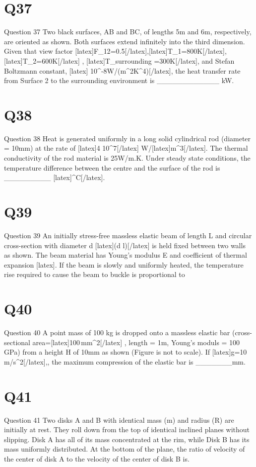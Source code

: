 \section*{Q37}
Question 37 Two black surfaces, AB and BC, of lengths 5m and 6m, respectively, are oriented as shown. Both surfaces extend infinitely into the third dimension. Given that view factor [latex]F\_{12}=0.5[/latex],[latex]T\_{1}=800K[/latex],[latex]T\_{2}=600K[/latex] , [latex]T\_{surrounding} =300K[/latex], and Stefan Boltzmann constant, [latex]\,\times\,10^{-8}W/(m^{2}K^{4})[/latex], the heat transfer rate from Surface 2 to the surrounding environment is \_\_\_\_\_\_\_\_\_\_\_\_ kW.

\section*{Q38}
Question 38 Heat is generated uniformly in a long solid cylindrical rod (diameter = 10mm) at the rate of [latex]4\,\times\,10^{7}[/latex]  W/[latex]m^{3}[/latex]. The thermal conductivity of the rod material is 25W/m.K. Under steady state conditions, the temperature difference between the centre and the surface of the rod is \_\_\_\_\_\_\_\_\_ [latex]^{\circ}C[/latex].

\section*{Q39}
Question 39 An initially stress-free massless elastic beam of length L and circular cross-section with diameter d [latex](d \lt \! \lt l)[/latex] is held fixed between two walls as shown. The beam material has Young's modulus E and coefficient of thermal expansion [latex]\alpha[/latex] . If the beam is slowly and uniformly heated, the temperature rise required to cause the beam to buckle is proportional to

\section*{Q40}
Question 40 A point mass of 100 kg is dropped onto a massless elastic bar (cross-sectional area=[latex]100\,mm^{2}[/latex] , length = 1m, Young's moduls = 100 GPa) from a height H of 10mm as shown (Figure is not to scale). If [latex]g=10\,m/s^{2}[/latex],, the maximum compression of the elastic bar is \_\_\_\_\_\_\_mm.

\section*{Q41}
Question 41 Two disks A and B with identical mass (m) and radius (R) are initially at rest. They roll down from the top of identical inclined planes without slipping. Disk A has all of its mass concentrated at the rim, while Disk B has its mass uniformly distributed. At the bottom of the plane, the ratio of velocity of the center of disk A to the velocity of the center of disk B is.

